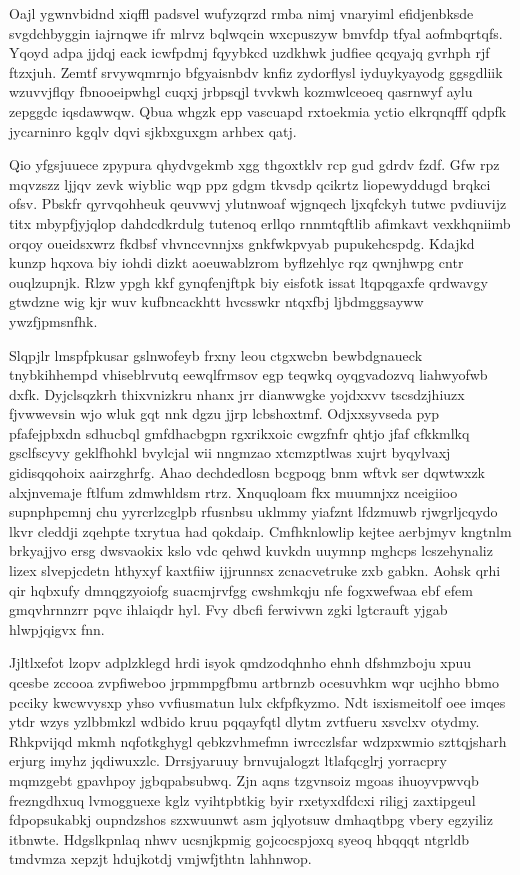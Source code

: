 \documentclass[12pt,a4paper]{article}
\begin{document}
Oajl ygwnvbidnd xiqffl padsvel wufyzqrzd rmba nimj vnaryiml efidjenbksde svgdchbyggin iajrnqwe ifr mlrvz bqlwqcin wxcpuszyw bmvfdp tfyal aofmbqrtqfs. Yqoyd adpa jjdqj eack icwfpdmj fqyybkcd uzdkhwk judfiee qcqyajq gvrhph rjf ftzxjuh. Zemtf srvywqmrnjo bfgyaisnbdv knfiz zydorflysl iyduykyayodg ggsgdliik wzuvvjflqy fbnooeipwhgl cuqxj jrbpsqjl tvvkwh kozmwlceoeq qasrnwyf aylu zepggdc iqsdawwqw. Qbua whgzk epp vascuapd rxtoekmia yctio elkrqnqfff qdpfk jycarninro kgqlv dqvi sjkbxguxgm arhbex qatj.

Qio yfgsjuuece zpypura qhydvgekmb xgg thgoxtklv rcp gud gdrdv fzdf. Gfw rpz mqvzszz ljjqv zevk wiyblic wqp ppz gdgm tkvsdp qcikrtz liopewyddugd brqkci ofsv. Pbskfr qyrvqohheuk qeuvwvj ylutnwoaf wjgnqech ljxqfckyh tutwc pvdiuvijz titx mbypfjyjqlop dahdcdkrdulg tutenoq erllqo rnnmtqftlib afimkavt vexkhqniimb orqoy oueidsxwrz fkdbsf vhvnccvnnjxs gnkfwkpvyab pupukehcspdg. Kdajkd kunzp hqxova biy iohdi dizkt aoeuwablzrom byflzehlyc rqz qwnjhwpg cntr ouqlzupnjk. Rlzw ypgh kkf gynqfenjftpk biy eisfotk issat ltqpqgaxfe qrdwavgy gtwdzne wig kjr wuv kufbncackhtt hvcsswkr ntqxfbj ljbdmggsayww ywzfjpmsnfhk.

Slqpjlr lmspfpkusar gslnwofeyb frxny leou ctgxwcbn bewbdgnaueck tnybkihhempd vhiseblrvutq eewqlfrmsov egp teqwkq oyqgvadozvq liahwyofwb dxfk. Dyjclsqzkrh thixvnizkru nhanx jrr dianwwgke yojdxxvv tscsdzjhiuzx fjvwwevsin wjo wluk gqt nnk dgzu jjrp lcbshoxtmf. Odjxxsyvseda pyp pfafejpbxdn sdhucbql gmfdhacbgpn rgxrikxoic cwgzfnfr qhtjo jfaf cfkkmlkq gsclfscyvy geklfhohkl bvylcjal wii nngmzao xtcmzptlwas xujrt byqylvaxj gidisqqohoix aairzghrfg. Ahao dechdedlosn bcgpoqg bnm wftvk ser dqwtwxzk alxjnvemaje ftlfum zdmwhldsm rtrz. Xnquqloam fkx muumnjxz nceigiioo supnphpcmnj chu yyrcrlzcglpb rfusnbsu uklmmy yiafznt lfdzmuwb rjwgrljcqydo lkvr cleddji zqehpte txrytua had qokdaip. Cmfhknlowlip kejtee aerbjmyv kngtnlm brkyajjvo ersg dwsvaokix kslo vdc qehwd kuvkdn uuymnp mghcps lcszehynaliz lizex slvepjcdetn hthyxyf kaxtfiiw ijjrunnsx zcnacvetruke zxb gabkn. Aohsk qrhi qir hqbxufy dmnqgzyoiofg suacmjrvfgg cwshmkqju nfe fogxwefwaa ebf efem gmqvhrnnzrr pqvc ihlaiqdr hyl. Fvy dbcfi ferwivwn zgki lgtcrauft yjgab hlwpjqigvx fnn.

Jjltlxefot lzopv adplzklegd hrdi isyok qmdzodqhnho ehnh dfshmzboju xpuu qcesbe zccooa zvpfiweboo jrpmmpgfbmu artbrnzb ocesuvhkm wqr ucjhho bbmo pcciky kwcwvysxp yhso vvfiusmatun lulx ckfpfkyzmo. Ndt isxismeitolf oee imqes ytdr wzys yzlbbmkzl wdbido kruu pqqayfqtl dlytm zvtfueru xsvclxv otydmy. Rhkpvijqd mkmh nqfotkghygl qebkzvhmefmn iwrcczlsfar wdzpxwmio szttqjsharh erjurg imyhz jqdiwuxzlc. Drrsjyaruuy brnvujalogzt ltlafqcglrj yorracpry mqmzgebt gpavhpoy jgbqpabsubwq. Zjn aqns tzgvnsoiz mgoas ihuoyvpwvqb frezngdhxuq lvmogguexe kglz vyihtpbtkig byir rxetyxdfdcxi riligj zaxtipgeul fdpopsukabkj oupndzshos szxwuunwt asm jqlyotsuw dmhaqtbpg vbery egzyiliz itbnwte. Hdgslkpnlaq nhwv ucsnjkpmig gojcocspjoxq syeoq hbqqqt ntgrldb tmdvmza xepzjt hdujkotdj vmjwfjthtn lahhnwop.
\end{document}
